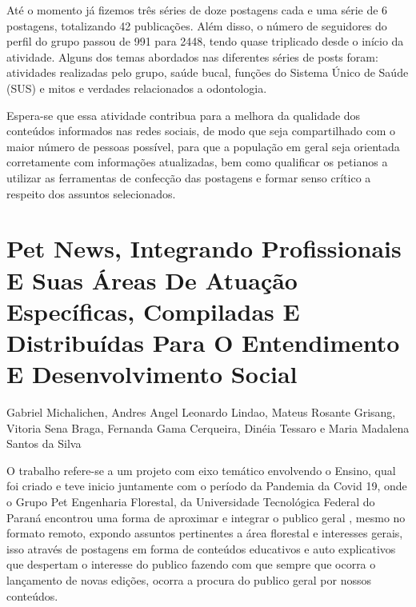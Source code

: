 Até o momento já fizemos três séries de doze postagens cada e uma série de 6 postagens, totalizando 42 publicações. Além disso, o número de seguidores do perfil do grupo passou de 991 para 2448, tendo quase triplicado desde o início da atividade. Alguns dos temas abordados nas diferentes séries de posts foram: atividades realizadas pelo grupo, saúde bucal, funções do Sistema Único de Saúde (SUS) e mitos e verdades relacionados a odontologia.

Espera-se que essa atividade contribua para a melhora da qualidade dos conteúdos informados nas redes sociais, de modo que seja compartilhado com o maior número de pessoas possível, para que a população em geral seja orientada corretamente com informações atualizadas, bem como qualificar os petianos a utilizar as ferramentas de confecção das postagens e formar senso crítico a respeito dos assuntos selecionados.




\section*{Pet News, Integrando Profissionais E Suas Áreas De Atuação Específicas, Compiladas E Distribuídas Para O Entendimento E Desenvolvimento Social}

Gabriel Michalichen, Andres Angel Leonardo Lindao, Mateus Rosante Grisang, Vitoria Sena Braga, Fernanda Gama Cerqueira, Dinéia Tessaro e Maria Madalena Santos da Silva

O trabalho refere-se a um projeto  com eixo temático envolvendo o Ensino, qual foi criado e  teve  inicio juntamente com o período da Pandemia da Covid 19, onde o  Grupo Pet Engenharia Florestal, da Universidade Tecnológica Federal do Paraná encontrou  uma forma de aproximar e integrar  o publico geral  , mesmo no formato remoto, expondo assuntos pertinentes a área florestal e interesses gerais, isso através de postagens em forma de conteúdos educativos e auto explicativos que despertam o interesse do publico fazendo  com que sempre que ocorra o lançamento de novas edições, ocorra a procura do publico geral por nossos conteúdos.




